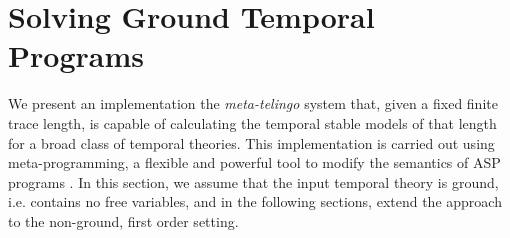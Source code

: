 \section{Solving Ground Temporal Programs}\label{sec:ground}

We present an implementation the \emph{meta-telingo} system that, given
a fixed finite trace length, is capable of calculating the temporal
stable models of that length for a broad class of temporal
theories. This implementation is carried out using meta-programming, a
flexible and powerful tool to modify the semantics of ASP programs
\cite{karoscwa21a} \cite{gepuscto08a} \cite{eifalepf03a}. In this
section, we assume that the input temporal theory is ground,
i.e. contains no free variables, and in the following sections, extend
the approach to the non-ground, first order setting.







